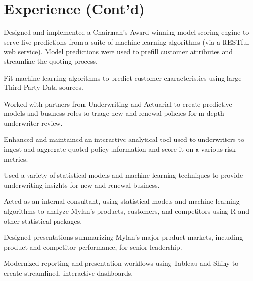 \documentclass[letterpaper]{deedy-resume} %
\begin{document}
\begin{minipage}[t]{0.9\textwidth}

  \section{Experience (Cont'd)}
  \hfill{}
  \hfill
  \vspace{\topsep}
  \begin{tightitemize}  
  \item Designed and implemented a Chairman's Award-winning model
    scoring engine to serve live predictions from a suite of machine
    learning algorithms (via a RESTful web service). Model predictions were used
    to prefill customer attributes and streamline the quoting process.
  \item Fit machine learning algorithms to predict customer characteristics using
    large Third Party Data sources.
  \item Worked with partners from Underwriting and Actuarial to create
    predictive models and business roles to triage new and renewal
    policies for in-depth underwriter review.
  \item Enhanced and maintained an interactive analytical tool used to
    underwriters to ingest and aggregate quoted policy information and score it
    on a various risk metrics.
  \item Used a variety of statistical models and machine learning techniques to
    provide underwriting insights for new and renewal business.
  \end{tightitemize}
  \sectionspace
  
  \hfill{}
  \hfill{}
  
  \begin{tightitemize}
  \item Acted as an internal consultant, using statistical models and machine
    learning algorithms to 
    analyze Mylan's products, customers, and competitors using R and
    other statistical packages.
  \item Designed presentations summarizing Mylan's major product markets,
    including product and competitor performance, for senior leadership.
  \item Modernized reporting and presentation workflows using Tableau and
    Shiny to create streamlined, interactive dashboards.
  \end{tightitemize}
  \sectionspace %


\end{minipage}
\end{document}
